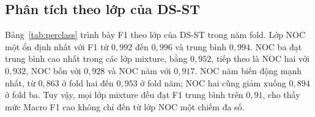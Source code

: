 \documentclass[12pt,a4paper]{article}
\begin{document}
\subsection{Phân tích theo lớp của DS-ST}

\begin{table}[H]
\centering
\caption{F1 theo lớp NOC của DS-ST trên từng fold GroupKFold 5. Tất cả giá trị được trích trực tiếp từ báo cáo phân loại.}
\label{tab:perclass}
\small
{}
\end{table}

Bảng~\ref{tab:perclass} trình bày F1 theo lớp của DS-ST trong năm fold. Lớp NOC một ổn định nhất với F1 từ $0{,}992$ đến $0{,}996$ và trung bình $0{,}994$. NOC ba đạt trung bình cao nhất trong các lớp mixture, bằng $0{,}952$, tiếp theo là NOC hai với $0{,}932$, NOC bốn với $0{,}928$ và NOC năm với $0{,}917$. NOC năm biến động mạnh nhất, từ $0{,}863$ ở fold hai đến $0{,}953$ ở fold năm; NOC hai cũng giảm xuống $0{,}894$ ở fold ba. Tuy vậy, mọi lớp mixture đều đạt F1 trung bình trên $0{,}91$, cho thấy mức Macro F1 cao không chỉ đến từ lớp NOC một chiếm đa số.
\end{document}
